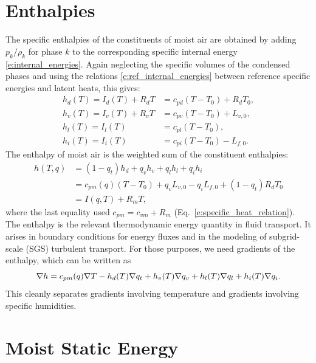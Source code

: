 \documentclass{report}
\begin{document}
\section{Enthalpies}\label{s:enthalpies}

The specific enthalpies of the constituents of moist air are obtained by adding $p_k/\rho_k$ for phase $k$ to the corresponding specific internal energy \eqref{e:internal_energies}. Again neglecting the specific volumes of the condensed phases and using the relations \eqref{e:ref_internal_energies} between reference specific energies and latent heats, this gives:
\begin{subequations}\label{e:enthalpies}
\begin{align}
    h_d(T) = I_d(T) + R_d T &= c_{pd}(T-T_0) + R_d T_0, \\
    h_v(T) = I_v(T) + R_v T &= c_{pv}(T-T_0) + L_{v,0}, \\
    h_l(T) = I_l(T) &= c_{pl}(T-T_0), \\
    h_i(T) = I_i(T) &= c_{pi}(T-T_0) - L_{f,0}.
\end{align}
\end{subequations}
The enthalpy of moist air is the weighted sum of the constituent enthalpies:
\begin{equation}
\begin{split}\label{e:enthalpy_definition}
    h(T, q)  &= (1-q_t) h_d + q_v h_v + q_l h_l + q_i h_i \\
        &= c_{pm}(q) (T-T_0) + q_v L_{v,0} - q_i L_{f,0} + (1-q_t) R_d T_0\\
        &= I(q, T) + R_m T,
\end{split}
\end{equation}
where the last equality used $c_{pm} = c_{vm} + R_m$ (Eq.~\ref{e:specific_heat_relation}). The enthalpy is the relevant thermodynamic energy quantity in fluid transport. It arises in boundary conditions for energy fluxes and in the modeling of subgrid-scale (SGS) turbulent transport. For those purposes, we need gradients of the enthalpy, which can be written as 
\begin{equation}\label{e:enthalpy_gradient}
    \nabla h = c_{pm}(q) \nabla T - h_d(T) \nabla q_t
    + h_v(T) \nabla q_v + h_l(T) \nabla q_l + h_i(T) \nabla q_i.
\end{equation}
This cleanly separates gradients involving temperature and gradients involving specific humidities.

\section{Moist Static Energy}
\end{document}
